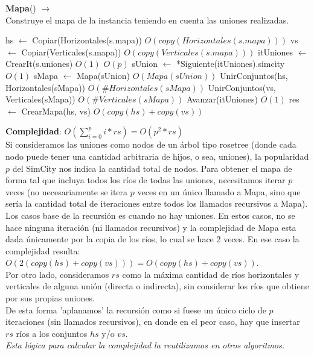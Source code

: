 \begin{Algoritmos}
\begin{algorithm}[H]{\textbf{Mapa}() $\to$ }
\\ {\small Construye el mapa de la instancia teniendo en cuenta las uniones realizadas.}
\begin{algorithmic}[1]
    \State hs $\gets$ Copiar(Horizontales(s.mapa)) \Comment $O(copy(Horizontales(s.mapa)))$
    \State vs $\gets$ Copiar(Verticales(s.mapa)) \Comment $O(copy(Verticales(s.mapa)))$
    \State itUniones $\gets$ CrearIt(s.uniones) \Comment $O(1)$
     \Comment $O(p)$
        \State sUnion $\gets$ *Siguiente(itUniones).simcity \Comment $O(1)$
        \State sMapa $\gets$ Mapa(sUnion) \Comment $O(Mapa(sUnion))$
        \State UnirConjuntos(hs, Horizontales(sMapa)) \Comment $O(\#Horizontales(sMapa))$
        \State UnirConjuntos(vs, Verticales(sMapa)) \Comment $O(\#Verticales(sMapa))$
        \State Avanzar(itUniones) \Comment $O(1)$
    \EndWhile
    \State res $\gets$ CrearMapa(hs, vs) \Comment $O(copy(hs) + copy(vs))$
\end{algorithmic}
\textbf{Complejidad}: $O( \sum_{i=0}^p i * rs ) = O( p^2 * rs )$ \\
Si consideramos las uniones como nodos de un árbol tipo rosetree (donde cada nodo puede tener una cantidad arbitraria de hijos, o sea, uniones), la popularidad $p$ del SimCity nos indica la cantidad total de nodos. Para obtener el mapa de forma tal que incluya todos los ríos de todas las uniones, necesitamos iterar $p$ veces (no necesariamente se itera $p$ veces en un único llamado a Mapa, sino que sería la cantidad total de iteraciones entre todos los llamados recursivos a Mapa). \\
Los casos base de la recursión es cuando no hay uniones. En estos casos, no se hace ninguna iteración (ni llamados recursivos) y la complejidad de Mapa esta dada únicamente por la copia de los ríos, lo cual se hace 2 veces. En ese caso la complejidad resulta: $O(2(copy(hs) + copy(vs))) = O(copy(hs) + copy(vs))$. \\
Por otro lado, consideramos $rs$ como la máxima cantidad de ríos horizontales y verticales de alguna unión (directa o indirecta), sin considerar los ríos que obtiene por sus propias uniones. \\
De esta forma 'aplanamos' la recursión como si fuese un único ciclo de $p$ iteraciones (sin llamados recursivos), en donde en el peor caso, hay que insertar $rs$ ríos a los conjuntos $hs$ y/o $vs$. \\
\em{Esta lógica para calcular la complejidad la reutilizamos en otros algoritmos.}
\end{algorithm}


\end{Algoritmos}
